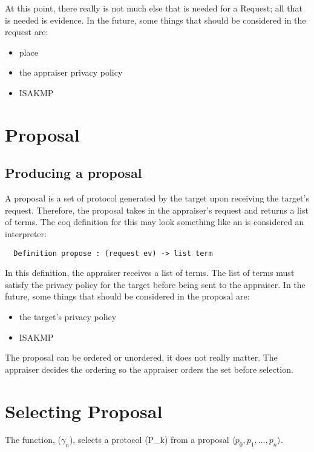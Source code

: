 \documentclass[10pt]{report}
\newcommand{\squash}{\itemsep=0pt\parskip=0pt}
\begin{document}
  
  At this point, there really is not much else that is needed for a
  Request; all that is needed is evidence. In the future, some things
  that should be considered in the request are:
  
  \begin{itemize}
   \squash
   \item place
   \item the appraiser privacy policy
   \item ISAKMP
  \end{itemize}

\section {Proposal}

\subsection {Producing a proposal}

A proposal is a set of protocol generated by the target upon receiving
the target's request. Therefore, the proposal takes in the appraiser's
request and returns a list of terms. The coq definition for this may
look something like an is considered an interpreter: 
  
  \begin{verbatim}
  Definition propose : (request ev) -> list term
  \end{verbatim}  
  
  In this definition, the appraiser receives a list of terms. The list
  of terms must satisfy the privacy policy for the target before being
  sent to the appraiser. In the future, some things that should be
  considered in the proposal are:
  
  \begin{itemize}
   \squash
   \item the target's privacy policy
   \item ISAKMP
  \end{itemize}
  
  The proposal can be ordered or unordered, it does not really
  matter. The appraiser decides the ordering so the appraiser orders
  the set before selection.  

\section {Selecting Proposal}

  The function, ($\gamma_{n}$), selects a protocol (P_{k}) 
  from a proposal $\langle p_0,p_1,\ldots,p_n\rangle$.  
\end{document}
